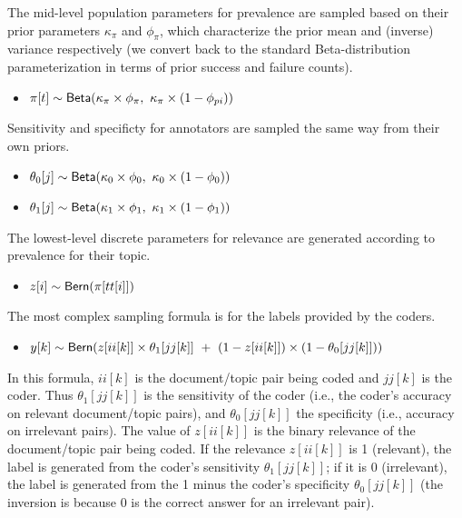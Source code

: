 \documentclass{article}
\begin{document}
The mid-level population parameters for prevalence are sampled
based on their prior parameters $\kappa_{\pi}$ and $\phi_{\pi}$, which
characterize the prior mean and (inverse) variance respectively (we 
convert back to the standard Beta-distribution parameterization in
terms of prior success and failure counts).
%
\begin{itemize}
\item $\pi[t] \sim \mbox{\sf Beta}(\kappa_{\pi} \times \phi_{\pi}, \
\kappa_{\pi} \times (1 - \phi_{pi}))$
\end{itemize}
%
Sensitivity and specificty for annotators are sampled the same way
from their own priors.
%
\begin{itemize}
\item $\theta_0[j] \sim \mbox{\sf Beta}(\kappa_0 \times \phi_0, 
\ \kappa_0 \times  (1 - \phi_0))$
\item $\theta_1[j] \sim \mbox{\sf Beta}(\kappa_1 \times \phi_1, 
\ \kappa_1 \times  (1 - \phi_1))$
\end{itemize}
%

The lowest-level discrete parameters for relevance are generated
according to prevalence for their topic.
%
\begin{itemize}
\item $z[i] \sim \mbox{\sf Bern}(\pi[tt[i]])$
\end{itemize}
%
The most complex sampling formula is for the labels provided
by the coders.
%
\begin{itemize}
\item $y[k] \sim \mbox{\sf Bern}(z[ii[k]] \times \theta_1[jj[k]] 
\ + \ (1 - z[ii[k]]) \times (1 - \theta_0[jj[k]]))$
\end{itemize}
%
In this formula, $ii[k]$ is the document/topic pair being coded and
$jj[k]$ is the coder.  Thus $\theta_1[jj[k]]$ is the sensitivity of
the coder (i.e., the coder's accuracy on relevant document/topic
pairs), and $\theta_0[jj[k]]$ the specificity (i.e., accuracy on
irrelevant pairs).  The value of $z[ii[k]]$ is the binary relevance of
the document/topic pair being coded.  If the relevance $z[ii[k]]$ is 1
(relevant), the label is generated from the coder's sensitivity
$\theta_1[jj[k]]$; if it is 0 (irrelevant), the label is generated
from the 1 minus the coder's specificity $\theta_0[jj[k]]$ (the
inversion is because 0 is the correct answer for an irrelevant pair).
\end{document}
